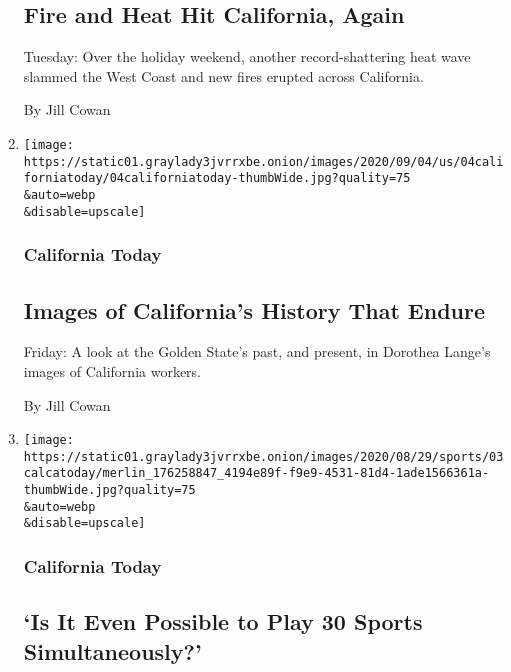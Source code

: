 \begin{enumerate}
  \hypertarget{fire-and-heat-hit-california-again}{%
  \subsection{Fire and Heat Hit California,
  Again}\label{fire-and-heat-hit-california-again}}

  Tuesday: Over the holiday weekend, another record-shattering heat wave
  slammed the West Coast and new fires erupted across California.

  By Jill Cowan
\item
  \href{/2020/09/04/us/california-immigrant-worker-photos-dorothea-lange.html}{}

  \texttt{[image: https://static01.graylady3jvrrxbe.onion/images/2020/09/04/us/04californiatoday/04californiatoday-thumbWide.jpg?quality=75\\\&auto=webp\\\&disable=upscale]}

  \hypertarget{california-today-4}{%
  \subsubsection{California Today}\label{california-today-4}}

  \hypertarget{images-of-californias-history-that-endure}{%
  \subsection{Images of California's History That
  Endure}\label{images-of-californias-history-that-endure}}

  Friday: A look at the Golden State's past, and present, in Dorothea
  Lange's images of California workers.

  By Jill Cowan
\item
  \href{/2020/09/03/us/john-branch-uc-berkeley.html}{}

  \texttt{[image: https://static01.graylady3jvrrxbe.onion/images/2020/08/29/sports/03calcatoday/merlin\_176258847\_4194e89f-f9e9-4531-81d4-1ade1566361a-thumbWide.jpg?quality=75\\\&auto=webp\\\&disable=upscale]}

  \hypertarget{california-today-5}{%
  \subsubsection{California Today}\label{california-today-5}}

  \hypertarget{is-it-even-possible-to-play-30-sports-simultaneously}{%
  \subsection{`Is It Even Possible to Play 30 Sports
  Simultaneously?'}\label{is-it-even-possible-to-play-30-sports-simultaneously}}


\end{enumerate}
